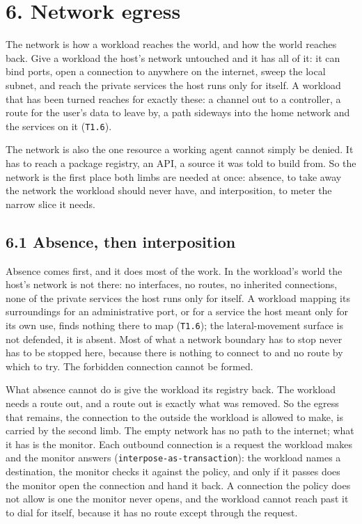 \hypertarget{network-egress}{%
\chapter{6. Network egress}\label{network-egress}}

The network is how a workload reaches the world, and how the world
reaches back. Give a workload the host's network untouched and it has
all of it: it can bind ports, open a connection to anywhere on the
internet, sweep the local subnet, and reach the private services the
host runs only for itself. A workload that has been turned reaches for
exactly these: a channel out to a controller, a route for the user's
data to leave by, a path sideways into the home network and the services
on it (\texttt{T1.6}).

The network is also the one resource a working agent cannot simply be
denied. It has to reach a package registry, an API, a source it was told
to build from. So the network is the first place both limbs are needed
at once: absence, to take away the network the workload should never
have, and interposition, to meter the narrow slice it needs.

\hypertarget{absence-then-interposition}{%
\section{6.1 Absence, then
interposition}\label{absence-then-interposition}}

Absence comes first, and it does most of the work. In the workload's
world the host's network is not there: no interfaces, no routes, no
inherited connections, none of the private services the host runs only
for itself. A workload mapping its surroundings for an administrative
port, or for a service the host meant only for its own use, finds
nothing there to map (\texttt{T1.6}); the lateral-movement surface is
not defended, it is absent. Most of what a network boundary has to stop
never has to be stopped here, because there is nothing to connect to and
no route by which to try. The forbidden connection cannot be formed.

What absence cannot do is give the workload its registry back. The
workload needs a route out, and a route out is exactly what was removed.
So the egress that remains, the connection to the outside the workload
is allowed to make, is carried by the second limb. The empty network has
no path to the internet; what it has is the monitor. Each outbound
connection is a request the workload makes and the monitor answers
(\texttt{interpose-as-transaction}): the workload names a destination,
the monitor checks it against the policy, and only if it passes does the
monitor open the connection and hand it back. A connection the policy
does not allow is one the monitor never opens, and the workload cannot
reach past it to dial for itself, because it has no route except through
the request.

